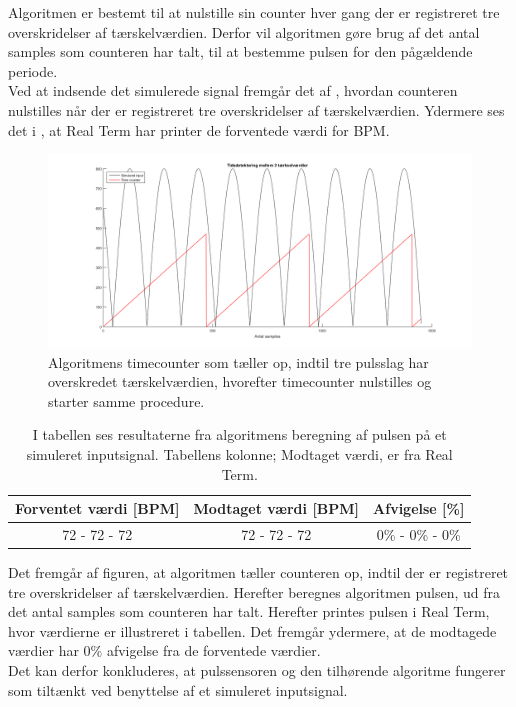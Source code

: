 Algoritmen er bestemt til at nulstille sin counter hver gang der er registreret tre overskridelser af tærskelværdien. Derfor vil algoritmen gøre brug af det antal samples som counteren har talt, til at bestemme pulsen for den pågældende periode. \\
Ved at indsende det simulerede signal fremgår det af , hvordan counteren nulstilles når der er registreret tre overskridelser af tærskelværdien. Ydermere ses det i , at Real Term har printer de forventede værdi for BPM.

\begin{figure}[H]
	\centering
	\includegraphics[scale=0.5]{figures/cDesign/timecounter_puls_pic.png}
	\caption{Algoritmens timecounter som tæller op, indtil tre pulsslag har overskredet tærskelværdien, hvorefter timecounter nulstilles og starter samme procedure.}
\label{fig:timecounter_puls_realterm}
\end{figure}

\begin{table}[H]
	\centering
	\begin{tabular}{ccc}
		\hline
		\rowcolor[HTML]{C0C0C0} 
		Forventet værdi [BPM] & Modtaget værdi [BPM] & Afvigelse [\%]\\ \hline
		72 - 72 - 72          & 72 - 72 - 72         & 0\% - 0\% - 0\% \\ \hline
	\end{tabular}
	\caption{I tabellen ses resultaterne fra algoritmens beregning af pulsen på et simuleret inputsignal. Tabellens kolonne; Modtaget værdi, er fra Real Term.}
	\label{tab:test_puls_realterm}
\end{table} \vspace{-0.5cm}

Det fremgår af figuren, at algoritmen tæller counteren op, indtil der er registreret tre overskridelser af tærskelværdien. Herefter beregnes algoritmen pulsen, ud fra det antal samples som counteren har talt. Herefter printes pulsen i Real Term, hvor værdierne er illustreret i tabellen. Det fremgår ydermere, at de modtagede værdier har 0\% afvigelse fra de forventede værdier. \\
Det kan derfor konkluderes, at pulssensoren og den tilhørende algoritme fungerer som tiltænkt ved benyttelse af et simuleret inputsignal. 

